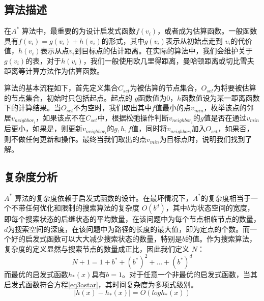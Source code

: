 \documentclass{standalone}
\begin{document}
\subsection{算法描述}
在$A^{*}$ 算法中，最重要的为设计启发式函数$f(v_i)$，或者成为估算函数。一般函数具有$f(v_i) = g(v_i) + h(v_i)$的形式，其中$g(v_i)$表示从初始点走到 $v_i$的代价值，$h(v_i)$表示从点$v_i$到目标点的估计距离。在实际的算法中，我们会维护关于$g(v_i)$的表，对于$h(v_i)$，我们一般使用欧几里得距离，曼哈顿距离或切比雪夫距离等计算方法作为估算函数。\par
算法的基本流程如下，首先定义集合$C_{set}$为被估算的节点集合，$O_{set}$为将要被估算的节点集合，初始时只包括起点。起点的 $g$函数值为0，$h$函数值设为某一距离函数下的计算结果。当$O_{set}$不为空时，我们取出其中$f$值最小的点$v_{min}$，枚举该点的邻居$v_{neighbor_i}$，如果该点不在$C_{set}$中，根据松弛操作判断$v_{neighbor_i}$的$g$值是否在通过$v_{min}$后更小，如果是，则更新$v_{neighbor_i}$的$g, h, f$值，同时将$v_{neighbor_i}$加入$O_{set}$，如果否，则不做任何更新和操作。最终当我们取出的点$v_{min}$为目标点时，说明我们找到了解。
\subsection{复杂度分析}
$A^{*}$ 算法的复杂度依赖于启发式函数的设计。在最坏情况下，$A^{*}$的复杂度相当于一个不带任何优化和限制的搜索算法的复杂度 $O(b^d)$，其中$b$为状态空间的宽度，即每个搜索状态的后继状态的平均数量，在该问题中为每个节点相临节点的数量，$d$为搜索空间的深度，在该问题中为路径的长度的最大值，即为定点的个数。而一个好的启发式函数可以大大减少搜索状态的数量，特别是$b$的值。作为搜索算法，复杂度的定义显然与搜索节点的数量成正比，因此我们定义 $N$： 
    \begin{equation}
        N + 1 = 1 + b^* + (b^*)^2 + ... + (b^*)^d
    \end{equation}
而最优的启发式函数$h_*(x)$具有$b=1$。对于任意一个非最优的启发式函数，当其启发式函数符合方程\ref{eq3astar}，其时间复杂度为多项式级别。
    \begin{equation}
    \label{eq3astar}
        |h(x) - h_*(x)| = O(logh_*(x))
    \end{equation}
\end{document}
